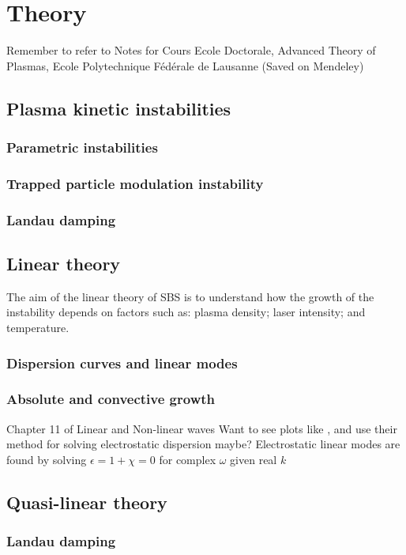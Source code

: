 \chapter{Theory}
\label{chp:theory}

Remember to refer to Notes for Cours Ecole Doctorale, Advanced Theory of Plasmas, Ecole Polytechnique Fédérale de Lausanne (Saved on Mendeley)

\section{Plasma kinetic instabilities}
\subsection{Parametric instabilities}
\subsection{Trapped particle modulation instability}
\subsection{Landau damping}

\section{Linear theory}
The aim of the linear theory of \acrshort{SBS} is to understand how the growth
 of the instability depends on factors such as: plasma density; laser intensity; and temperature.
\subsection{Dispersion curves and linear modes}
\subsection{Absolute and convective growth}
Chapter 11 of Linear and Non-linear waves
Want to see plots like \cite{Strozzi2007}, and use their method for solving
electrostatic dispersion maybe? Electrostatic linear modes are found by solving
 $\epsilon = 1 + \chi = 0$ for complex $\omega$ given real $k$

\section{Quasi-linear theory}
\subsection{Landau damping}

